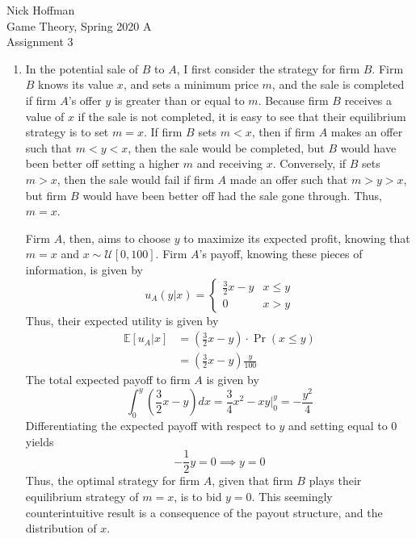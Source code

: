 \documentclass[11pt]{article}
\newcommand{\ev}{\mathbb{E}}
\begin{document}
\begin{flushleft}
	Nick Hoffman \\
	Game Theory, Spring 2020 A \\
	Assignment 3 \\
\end{flushleft}

\begin{enumerate}
	\item In the potential sale of $ B $ to $ A $, I first consider the strategy for firm $ B $. Firm $ B $ knows its value $ x $, and sets a minimum price $ m $, and the sale is completed if firm $ A $'s offer $ y $ is greater than or equal to $ m $. Because firm $ B $ receives a value of $ x $ if the sale is not completed, it is easy to see that their equilibrium strategy is to set $ m = x $. If firm $ B $ sets $ m < x $, then if firm $ A $ makes an offer such that $ m < y < x $, then the sale would be completed, but $ B $ would have been better off setting a higher $ m $ and receiving $ x $. Conversely, if $ B $ sets $ m > x $, then the sale would fail if firm $ A $ made an offer such that $ m > y > x $, but firm $ B $ would have been better off had the sale gone through. Thus, $ m = x $.
	
	Firm $ A $, then, aims to choose $ y $ to maximize its expected profit, knowing that $ m = x $ and $ x\sim \mathcal{U}[0,100] $. Firm $ A $'s payoff, knowing these pieces of information, is given by 
	\[u_A(y|x) = \begin{cases}
	\frac{3}{2}x - y & x \leq y \\
	0 & x > y
	\end{cases}\]
	Thus, their expected utility is given by 
	\begin{align*}
	\ev[u_A|x] &= \left(\frac{3}{2}x - y\right)\cdot\Pr(x \leq y) \\
	 &= \left(\frac{3}{2}x - y\right)\frac{y}{100} 
	\end{align*}
	The total expected payoff to firm $ A $ is given by 
	\[\int_{0}^{y}\left(\frac{3}{2}x - y\right) dx = \frac{3}{4}x^2 - xy \Biggr|_0^y = -\frac{y^2}{4}\]
	Differentiating the expected payoff with respect to $ y $ and setting equal to 0 yields
	\[-\frac{1}{2}y = 0 \implies y = 0 \]
	Thus, the optimal strategy for firm $ A $, given that firm $ B $ plays their equilibrium strategy of $ m = x $, is to bid $ y = 0 $. This seemingly counterintuitive result is a consequence of the payout structure, and the distribution of $ x $. 
	

\end{enumerate}
\end{document}
